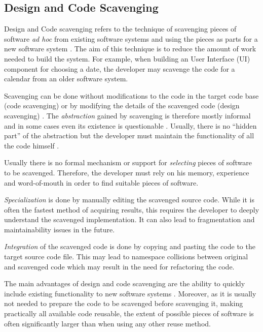 \subsection{Design and Code Scavenging}

Design and Code scavenging refers to the technique of scavenging pieces of software \emph{ad hoc} from existing software systems and using the pieces as parts for a new software system  \citep[chap.~4]{krueger_software_1992}. The aim of this technique is to reduce the amount of work needed to build the system. For example, when building an User Interface (UI) component for choosing a date, the developer may scavenge the code for a calendar from an older software system.

Scavenging can be done without modifications to the code in the target code base (code scavenging) or by modifying the details of the scavenged code (design scavenging) \citep[chap.~4]{krueger_software_1992}. The \emph{abstraction} gained by scavenging is therefore mostly informal and in some cases even its existence is questionable \citep[chap.~3]{sametinger_software_1997}. Usually, there is no ``hidden part'' of the abstraction but the developer must maintain the functionality of all the code himself \citep[chap.~3]{sametinger_software_1997}.

Usually there is no formal mechanism or support for \emph{selecting} pieces of software to be scavenged. Therefore, the developer must rely on his memory, experience and word-of-mouth in order to find suitable pieces of software. \citep[chap.~3]{sametinger_software_1997}

\emph{Specialization} is done by manually editing the scavenged source code. While it is often the fastest method of acquiring results, this requires the developer to deeply understand the scavenged implementation. It can also lead to fragmentation and maintainability issues in the future. \citep[chap.~4]{krueger_software_1992}

\emph{Integration} of the scavenged code is done by copying and pasting the code to the target source code file. This may lead to namespace collisions between original and scavenged code which may result in the need for refactoring the code. \citep[chap.~4]{krueger_software_1992}

The main advantages of design and code scavenging are the ability to quickly include existing functionality to new software systems \citep[chap.~4]{krueger_software_1992}. Moreover, as it is usually not needed to prepare the code to be scavenged before scavenging it, making  practically all available code reusable, the extent of possible pieces of software is often significantly larger than when using any other reuse method. 

